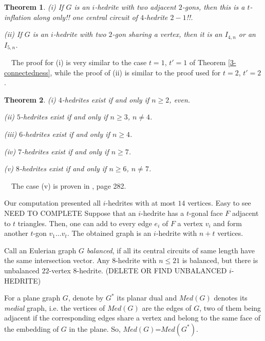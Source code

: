 \documentclass[12pt]{article}
\newtheorem{theor}{Theorem}
\newcommand{\proof}{\noindent{\bf Proof.}\ \ }
\begin{document}
\begin{theor}
(i) If $G$ is an $i$-hedrite with two adjacent $2$-gons, then this is a $t$-inflation along only!! one central circuit of $4$-hedrite $2-1$!!.

(ii) If $G$ is an $i$-hedrite with two $2$-gon sharing a vertex, then it is an $I_{4,n}$ or an $I_{5,n}$.

\end{theor}

\proof The proof for (i) is very similar to the case $t=1$, $t'=1$ of Theorem \ref{3-connectedness}, while the proof of (ii) is similar to the proof used for $t=2$, $t'=2$.





\begin{theor}

(i) $4$-hedrites exist if and only if $n\geq 2$, even.

(ii) $5$-hedrites exist if and only if $n\geq 3$, $n\not= 4$.

(iii) $6$-hedrites exist if and only if $n\geq 4$.

(iv) $7$-hedrites exist if and only if $n\geq 7$.

(v) $8$-hedrites exist if and only if $n\geq 6$, $n\not= 7$.

\end{theor}
\proof The case (v) is proven in \cite{Gr}, page 282.

Our computation presented all $i$-hedrites with at most $14$ vertices. Easy to see NEED TO COMPLETE
Suppose that an $i$-hedrite has a $t$-gonal face $F$ adjacent to $t$ triangles. Then, one can add to every edge $e_i$ of $F$ a vertex $v_i$ and form another $t$-gon $v_1\dots v_t$. The obtained graph is an $i$-hedrite with $n+t$ vertices.




Call an Eulerian graph $G$ {\it balanced}, if all its central circuits of
same length have the same intersection vector.
Any $8$-hedrite with $n \le 21$ is balanced, but there is unbalanced $22$-vertex $8$-hedrite. (DELETE OR FIND UNBALANCED $i$-HEDRITE)







For a plane graph $G$, denote by $G^*$ its planar dual and {\em $Med(G)$} 
denotes its {\em medial} graph, i.e. the vertices of $Med(G)$ are the edges of 
$G$, two of them being adjacent if the corresponding edges share a vertex and 
belong to the same face of the embedding of $G$ in the plane. 
So, $Med(G)$=$Med(G^*)$.
\end{document}
